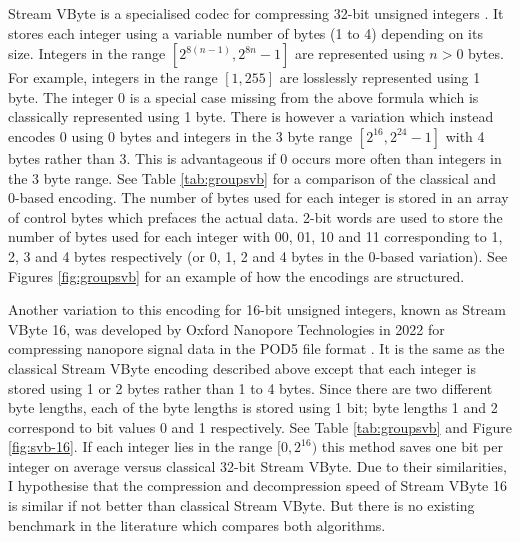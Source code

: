 

\label{subsubsec:svb}
Stream VByte is a specialised codec for compressing 32-bit unsigned integers \cite{svb}. It stores each integer using a variable number of bytes (1 to 4) depending on its size. Integers in the range $[2^{8(n-1)},2^{8n}-1]$ are represented using $n>0$ bytes. For example, integers in the range $[1,255]$ are losslessly represented using 1 byte. The integer 0 is a special case missing from the above formula which is classically represented using 1 byte. There is however a variation which instead encodes 0 using 0 bytes and integers in the 3 byte range $[2^{16},2^{24}-1]$ with 4 bytes rather than 3. This is advantageous if 0 occurs more often than integers in the 3 byte range. See Table \ref{tab:groupsvb} for a comparison of the classical and 0-based encoding. The number of bytes used for each integer is stored in an array of control bytes which prefaces the actual data. 2-bit words are used to store the number of bytes used for each integer with 00, 01, 10 and 11 corresponding to 1, 2, 3 and 4 bytes respectively (or 0, 1, 2 and 4 bytes in the 0-based variation). See Figures \ref{fig:groupsvb} for an example of how the encodings are structured.

%



Another variation to this encoding for 16-bit unsigned integers, known as Stream VByte 16, was developed by Oxford Nanopore Technologies in 2022 for compressing nanopore signal data in the POD5 file format \cite{pod5}. It is the same as the classical Stream VByte encoding described above except that each integer is stored using 1 or 2 bytes rather than 1 to 4 bytes. Since there are two different byte lengths, each of the byte lengths is stored using 1 bit; byte lengths 1 and 2 correspond to bit values 0 and 1 respectively. See Table \ref{tab:groupsvb} and Figure \ref{fig:svb-16}. If each integer lies in the range $[0, 2^{16})$ this method saves one bit per integer on average versus classical 32-bit Stream VByte. Due to their similarities, I hypothesise that the compression and decompression speed of Stream VByte 16 is similar if not better than classical Stream VByte. But there is no existing benchmark in the literature which compares both algorithms.

